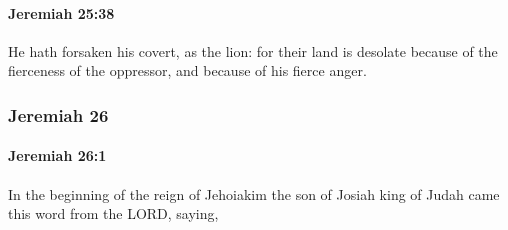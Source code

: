 		\paragraph{Jeremiah 25:38} %
			\label{JEREMIAH-25-38}

			He hath forsaken his covert, as the lion: for their land is desolate because of the fierceness of the oppressor, and because of his fierce anger.

	\subsubsection{Jeremiah 26} %
		\label{JEREMIAH-26}

		\paragraph{Jeremiah 26:1} %
			\label{JEREMIAH-26-1}

			In the beginning of the reign of Jehoiakim the son of Josiah king of Judah came this word from the LORD, saying,

